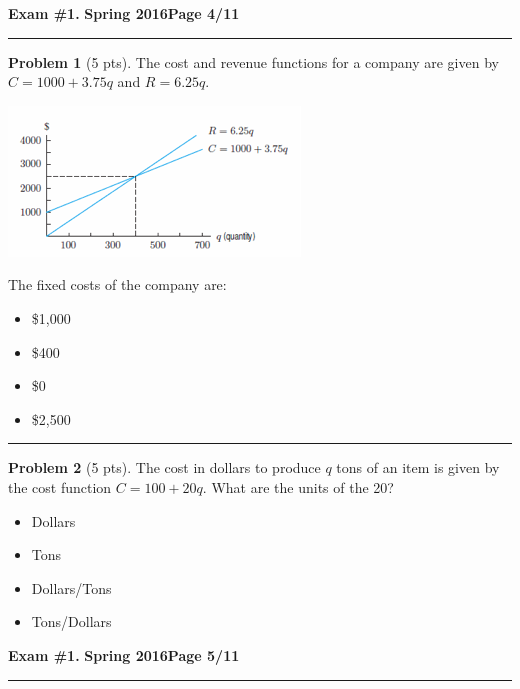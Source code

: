 \documentclass[12pt]{article}
\makeatletter
\theoremstyle{definition}
\newtheorem{problem}{Problem}
\newcommand*{\radiobutton}{%
  \@ifstar{\@radiobutton0}{\@radiobutton1}%
}
\newcommand*{\@radiobutton}[1]{%
  \begin{tikzpicture}
    \pgfmathsetlengthmacro\radius{height("X")/2}
    \draw[radius=\radius] circle;
    \ifcase#1 \fill[radius=.6*\radius] circle;\fi
  \end{tikzpicture}%
}
\makeatother
\begin{document}
\newpage

\hfill{\large\bf Exam \#1.}\hfill{\large\bf
  Spring 2016}\hfill{\large\bf Page 4/11}\hrule

\bigskip
\begin{problem}[5 pts]
The cost and revenue functions for a company are given by $C = 1000 + 3.75q$ and $R = 6.25q$.
\begin{center}
\includegraphics{1graph1.png}
\end{center}
The fixed costs of the company are:
\begin{itemize}
\item[\radiobutton] \$1,000 
\item[\radiobutton] \$400
\item[\radiobutton] \$0
\item[\radiobutton] \$2,500
\end{itemize}
\end{problem}
\hrule

\begin{problem}[5 pts]
The cost in dollars to produce $q$ tons of an item is given by the cost function $C = 100 + 20q$. What are the units of the 20?
\begin{itemize}
\item[\radiobutton] Dollars
\item[\radiobutton] Tons
\item[\radiobutton] Dollars/Tons
\item[\radiobutton] Tons/Dollars
\end{itemize} 

\end{problem}

\newpage

\hfill{\large\bf Exam \#1.}\hfill{\large\bf
  Spring 2016}\hfill{\large\bf Page 5/11}\hrule
\end{document}
